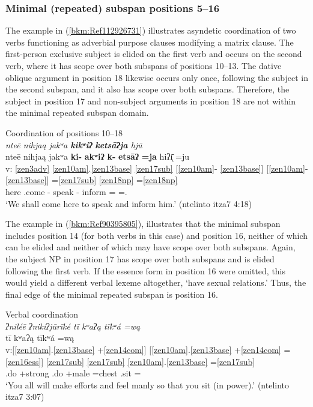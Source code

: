 \documentclass[output=paper]{langscibook}
\begin{document}
\subsubsection{Minimal (repeated) subspan positions 5{}--16}
\label{bkm:Ref113307833}
The example in (\ref{bkm:Ref112926731}) illustrates asyndetic coordination of two verbs functioning as adverbial purpose clauses modifying a matrix clause. The first-person exclusive subject is elided on the first verb and occurs on the second verb, where it has scope over both subspans of positions 10{}--13. The dative oblique argument in position 18 likewise occurs only once, following the subject in the second subspan, and it also has scope over both subspans. Therefore, the subject in position 17 and non-subject arguments in position 18 are not within the minimal repeated subspan domain.


\ea\label{bkm:Ref112926731} Coordination of positions 10{}--18\\
\textit{ nteē nihjaą jakʷa \textbf{kikʷiʔ} \textbf{ketsāʔja} hjū}\\ 
\glll {} nteē nihjaą jakʷa \textbf{ki-} \textbf{akʷiʔ} \textbf{k-} \textbf{etsāʔ} \textbf{=ja} hiʔ\={\k{ı}} =ju\\
v: \ref{zen3adv} \ref{zen10am}.\ref{zen13base} \ref{zen17sub}  [\ref{zen10am}{}- \ref{zen13base}] [\ref{zen10am}{}- \ref{zen13base}] =\ref{zen17sub} \ref{zen18np} =\ref{zen18np} \\
{} here \Pot{}.come \First\Excl{} \Pot{}- speak \Pot{}- inform =\First\Excl{} \Dat{} =\Third\Sg.\M{}\\
\glt `We shall come here to speak and inform him.' (ntelinto itza7 4:18)
\z

The example in (\ref{bkm:Ref90395805}), illustrates that the minimal subspan includes position 14 (for both verbs in this case) and position 16, neither of which can be elided and neither of which may have scope over both subspans. Again, the subject NP in position 17 has scope over both subspans and is elided following the first verb. If the essence form in position 16 were omitted, this would yield a different verbal lexeme altogether, `have sexual relations.' Thus, the final edge of the minimal repeated subspan is position 16.


\newpage

\ea\label{bkm:Ref90395805}Verbal coordination \\ 
\textit{ ʔniléē ʔnikíʔjūrīké tī kʷaʔą tīkʷá =wą}\\
 tī kʷaʔą tīkʷá =wą\\
v:[\ref{zen10am}.\ref{zen13base} +\ref{zen14com}] [\ref{zen10am}.\ref{zen13base} +\ref{zen14com} =\ref{zen16ess}] \ref{zen17sub} \ref{zen17sub} \ref{zen10am}.\ref{zen13base} =\ref{zen17sub} \\
\Pot{}.do +strong \Pot{}.do +male =chest \Tplz{} \Second\Pl{} \Pot{}.sit =\Second\Pl{}\\
\glt `You all will make efforts and feel manly so that you sit (in power).' (ntelinto itza7 3:07)
\z
\end{document}
